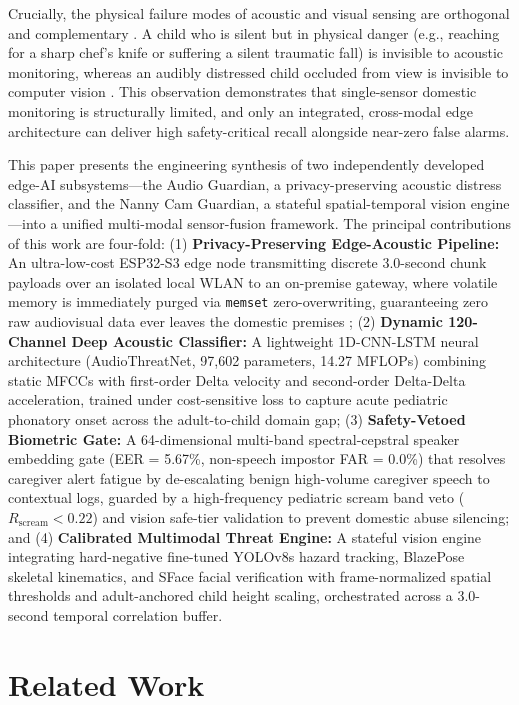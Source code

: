 \documentclass[conference]{IEEEtran}
\begin{document}
Crucially, the physical failure modes of acoustic and visual sensing are orthogonal and complementary \cite{b17}. A child who is silent but in physical danger (e.g., reaching for a sharp chef's knife or suffering a silent traumatic fall) is invisible to acoustic monitoring, whereas an audibly distressed child occluded from view is invisible to computer vision \cite{b2}. This observation demonstrates that single-sensor domestic monitoring is structurally limited, and only an integrated, cross-modal edge architecture can deliver high safety-critical recall alongside near-zero false alarms.

This paper presents the engineering synthesis of two independently developed edge-AI subsystems---the Audio Guardian, a privacy-preserving acoustic distress classifier, and the Nanny Cam Guardian, a stateful spatial-temporal vision engine---into a unified multi-modal sensor-fusion framework. The principal contributions of this work are four-fold: (1) \textbf{Privacy-Preserving Edge-Acoustic Pipeline:} An ultra-low-cost ESP32-S3 edge node transmitting discrete 3.0-second chunk payloads over an isolated local WLAN to an on-premise gateway, where volatile memory is immediately purged via \texttt{memset} zero-overwriting, guaranteeing zero raw audiovisual data ever leaves the domestic premises \cite{b1}; (2) \textbf{Dynamic 120-Channel Deep Acoustic Classifier:} A lightweight 1D-CNN-LSTM neural architecture (AudioThreatNet, 97,602 parameters, 14.27 MFLOPs) combining static MFCCs with first-order Delta velocity and second-order Delta-Delta acceleration, trained under cost-sensitive loss to capture acute pediatric phonatory onset across the adult-to-child domain gap; (3) \textbf{Safety-Vetoed Biometric Gate:} A 64-dimensional multi-band spectral-cepstral speaker embedding gate (EER = 5.67\%, non-speech impostor FAR = 0.0\%) that resolves caregiver alert fatigue by de-escalating benign high-volume caregiver speech to contextual logs, guarded by a high-frequency pediatric scream band veto ($R_{\text{scream}} < 0.22$) and vision safe-tier validation to prevent domestic abuse silencing; and (4) \textbf{Calibrated Multimodal Threat Engine:} A stateful vision engine integrating hard-negative fine-tuned YOLOv8s hazard tracking, BlazePose skeletal kinematics, and SFace facial verification with frame-normalized spatial thresholds and adult-anchored child height scaling, orchestrated across a 3.0-second temporal correlation buffer.

\section{Related Work}
\end{document}
